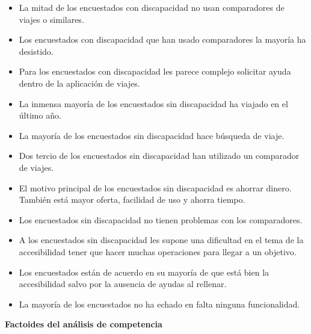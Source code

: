 \begin{itemize}
    \item La mitad de los encuestados con discapacidad no usan comparadores de viajes o similares.
    \item Los encuestados con discapacidad que han usado comparadores la mayoría ha desistido.
    \item Para los encuestados con discapacidad les parece complejo solicitar ayuda dentro de la aplicación de viajes.
    \item La inmensa mayoría de los encuestados sin discapacidad ha viajado en el último año.
    \item La mayoría de los encuestados sin discapacidad hace búsqueda de viaje.
    \item Dos tercio de los encuestados sin discapacidad han utilizado un comparador de viajes.
    \item El motivo principal de los encuestados sin discapacidad es ahorrar dinero. También está mayor oferta, facilidad de uso y ahorra tiempo.
    \item Los encuestados sin discapacidad no tienen problemas con los comparadores.
    \item A los encuestados sin discapacidad les supone una dificultad en el tema de la accesibilidad tener que hacer muchas operaciones para llegar a un objetivo.
    \item Los encuestados están de acuerdo en su mayoría de que está bien la accesibilidad salvo por la ausencia de ayudas al rellenar.
    \item La mayoría de los encuestados no ha echado en falta ninguna funcionalidad.
\end{itemize}


\textbf{Factoides del análisis de competencia}

